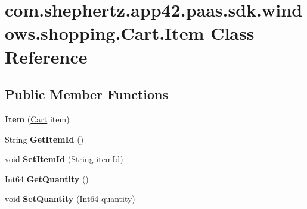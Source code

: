 \hypertarget{classcom_1_1shephertz_1_1app42_1_1paas_1_1sdk_1_1windows_1_1shopping_1_1_cart_1_1_item}{\section{com.\+shephertz.\+app42.\+paas.\+sdk.\+windows.\+shopping.\+Cart.\+Item Class Reference}
\label{classcom_1_1shephertz_1_1app42_1_1paas_1_1sdk_1_1windows_1_1shopping_1_1_cart_1_1_item}
}
\subsection*{Public Member Functions}
\begin{DoxyCompactItemize}
\item 
\hypertarget{classcom_1_1shephertz_1_1app42_1_1paas_1_1sdk_1_1windows_1_1shopping_1_1_cart_1_1_item_a5ec531e1fc7d011905cd7de3441c4919}{{\bfseries Item} (\hyperlink{classcom_1_1shephertz_1_1app42_1_1paas_1_1sdk_1_1windows_1_1shopping_1_1_cart}{Cart} item)}\label{classcom_1_1shephertz_1_1app42_1_1paas_1_1sdk_1_1windows_1_1shopping_1_1_cart_1_1_item_a5ec531e1fc7d011905cd7de3441c4919}

\item 
\hypertarget{classcom_1_1shephertz_1_1app42_1_1paas_1_1sdk_1_1windows_1_1shopping_1_1_cart_1_1_item_a53718dca9a7139df72ce7091b488219a}{String {\bfseries Get\+Item\+Id} ()}\label{classcom_1_1shephertz_1_1app42_1_1paas_1_1sdk_1_1windows_1_1shopping_1_1_cart_1_1_item_a53718dca9a7139df72ce7091b488219a}

\item 
\hypertarget{classcom_1_1shephertz_1_1app42_1_1paas_1_1sdk_1_1windows_1_1shopping_1_1_cart_1_1_item_a6cd66f89fa941eaa8d878834bba96c4d}{void {\bfseries Set\+Item\+Id} (String item\+Id)}\label{classcom_1_1shephertz_1_1app42_1_1paas_1_1sdk_1_1windows_1_1shopping_1_1_cart_1_1_item_a6cd66f89fa941eaa8d878834bba96c4d}

\item 
\hypertarget{classcom_1_1shephertz_1_1app42_1_1paas_1_1sdk_1_1windows_1_1shopping_1_1_cart_1_1_item_afc4237eb3082cd67af2e937f446c684e}{Int64 {\bfseries Get\+Quantity} ()}\label{classcom_1_1shephertz_1_1app42_1_1paas_1_1sdk_1_1windows_1_1shopping_1_1_cart_1_1_item_afc4237eb3082cd67af2e937f446c684e}

\item 
\hypertarget{classcom_1_1shephertz_1_1app42_1_1paas_1_1sdk_1_1windows_1_1shopping_1_1_cart_1_1_item_a99d44074efc0be585dd9ee54b7d0d0c7}{void {\bfseries Set\+Quantity} (Int64 quantity)}\label{classcom_1_1shephertz_1_1app42_1_1paas_1_1sdk_1_1windows_1_1shopping_1_1_cart_1_1_item_a99d44074efc0be585dd9ee54b7d0d0c7}


\end{DoxyCompactItemize}
